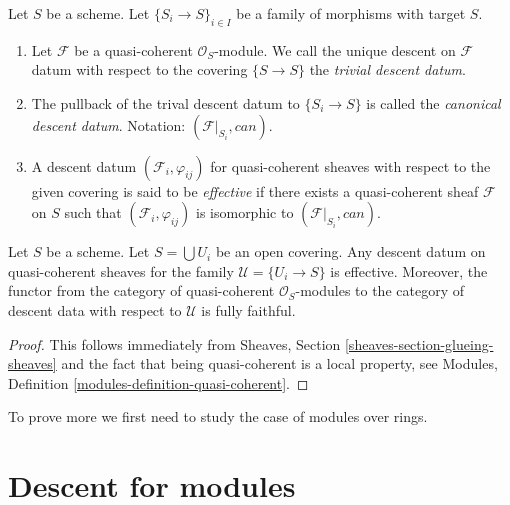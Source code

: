 \begin{definition}
\label{definition-descent-datum-effective-quasi-coherent}
Let $S$ be a scheme.
Let $\{S_i \to S\}_{i \in I}$ be a family of morphisms
with target $S$.
\begin{enumerate}
\item Let $\mathcal{F}$ be a quasi-coherent $\mathcal{O}_S$-module.
We call the unique descent on $\mathcal{F}$ datum with respect to the covering
$\{S \to S\}$ the {\it trivial descent datum}.
\item The pullback of the trival descent datum to
$\{S_i \to S\}$ is called the {\it canonical descent datum}.
Notation: $(\mathcal{F}|_{S_i}, can)$.
\item A descent datum $(\mathcal{F}_i, \varphi_{ij})$
for quasi-coherent sheaves with respect to the given covering
is said to be {\it effective} if there exists a quasi-coherent
sheaf $\mathcal{F}$ on $S$ such that $(\mathcal{F}_i, \varphi_{ij})$
is isomorphic to $(\mathcal{F}|_{S_i}, can)$.
\end{enumerate}
\end{definition}

\begin{lemma}
\label{lemma-zariski-descent-effective}
Let $S$ be a scheme.
Let $S = \bigcup U_i$ be an open covering.
Any descent datum on quasi-coherent sheaves
for the family $\mathcal{U} = \{U_i \to S\}$ is
effective. Moreover, the functor from the category of
quasi-coherent $\mathcal{O}_S$-modules to the category
of descent data with respect to $\mathcal{U}$ is fully faithful.
\end{lemma}

\begin{proof}
This follows immediately from
Sheaves, Section \ref{sheaves-section-glueing-sheaves}
and the fact that being quasi-coherent is a local property, see
Modules, Definition \ref{modules-definition-quasi-coherent}.
\end{proof}

\noindent
To prove more we first need to study the case of modules over rings.










\section{Descent for modules}
\label{section-descent-modules}

